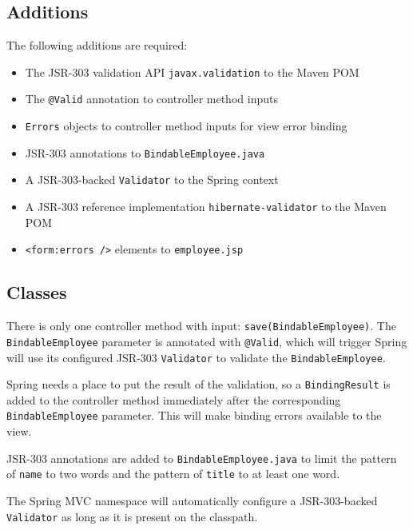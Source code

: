 \documentclass{article}
\begin{document}
\subsection{Additions}

The following additions are required:

\begin{itemize}
\item The JSR-303 validation API \texttt{javax.validation} to the Maven POM
\item The \texttt{@Valid} annotation to controller method inputs
\item \texttt{Errors} objects to controller method inputs for view error binding
\item JSR-303 annotations to \texttt{BindableEmployee.java}
\item A JSR-303-backed \texttt{Validator} to the Spring context
\item A JSR-303 reference implementation \texttt{hibernate-validator} to the Maven POM
\item \texttt{<form:errors />} elements to \texttt{employee.jsp}
\end{itemize}

\subsection{Classes}

There is only one controller method with input: \texttt{save(BindableEmployee)}.  The \texttt{BindableEmployee} parameter is annotated with \texttt{@Valid}, which will trigger Spring will use its configured JSR-303 \texttt{Validator} to validate the \texttt{BindableEmployee}.

Spring needs a place to put the result of the validation, so a \texttt{BindingResult} is added to the controller method immediately after the corresponding \texttt{BindableEmployee} parameter.  This will make binding errors available to the view.



JSR-303 annotations are added to \texttt{BindableEmployee.java} to limit the pattern of \texttt{name} to two words and the pattern of \texttt{title} to at least one word.



The Spring MVC namespace will automatically configure a JSR-303-backed \texttt{Validator} as long as it is present on the classpath.
\end{document}
